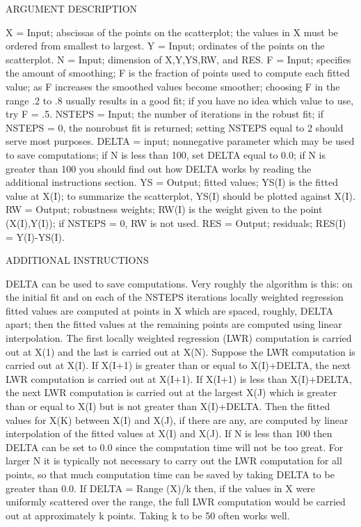 \begin{DoxyVerb}ARGUMENT DESCRIPTION

      X =       Input; abscissas of the points on the
                scatterplot; the values in X must be ordered
                from smallest to largest.
      Y =       Input; ordinates of the points on the
                scatterplot.
      N =       Input; dimension of X,Y,YS,RW, and RES.
      F =       Input; specifies the amount of smoothing; F is
                the fraction of points used to compute each
                fitted value; as F increases the smoothed values
                become smoother; choosing F in the range .2 to
                .8 usually results in a good fit; if you have no
                idea which value to use, try F = .5.
      NSTEPS =  Input; the number of iterations in the robust
                fit; if NSTEPS = 0, the nonrobust fit is
                returned; setting NSTEPS equal to 2 should serve
                most purposes.
      DELTA =   input; nonnegative parameter which may be used
                to save computations; if N is less than 100, set
                DELTA equal to 0.0; if N is greater than 100 you
                should find out how DELTA works by reading the
                additional instructions section.
      YS =      Output; fitted values; YS(I) is the fitted value
                at X(I); to summarize the scatterplot, YS(I)
                should be plotted against X(I).
      RW =      Output; robustness weights; RW(I) is the weight
                given to the point (X(I),Y(I)); if NSTEPS = 0,
                RW is not used.
      RES =     Output; residuals; RES(I) = Y(I)-YS(I).


ADDITIONAL INSTRUCTIONS

    DELTA can be used to save computations.
    Very roughly the algorithm is this:
    on the initial fit and on each of the NSTEPS iterations locally weighted regression fitted values are computed
    at points in X which are spaced, roughly, DELTA apart;
    then the fitted values at the remaining points are computed using linear interpolation.
    The first locally weighted regression (LWR) computation is carried out at X(1) and the last is carried out at X(N).
    Suppose the LWR computation is carried out at X(I).
    If X(I+1) is greater than or equal to X(I)+DELTA, the next LWR computation is carried out at X(I+1).
    If X(I+1) is less than X(I)+DELTA, the next LWR computation is carried out at the largest X(J) which is greater than
    or equal to X(I) but is not greater than X(I)+DELTA.
    Then the fitted values for X(K) between X(I) and X(J), if there are any, are computed by linear interpolation
    of the fitted values at X(I) and X(J).
    If N is less than 100 then DELTA can be set to 0.0 since the computation time will not be too great.
    For larger N it is typically not necessary to carry out the LWR computation for all points,
    so that much computation time can be saved by taking DELTA to be greater than 0.0.
    If DELTA = Range (X)/k then,
    if the values in X were uniformly scattered over the range,
    the full LWR computation would be carried out at approximately k points.
    Taking k to be 50 often works well.


\end{DoxyVerb}
